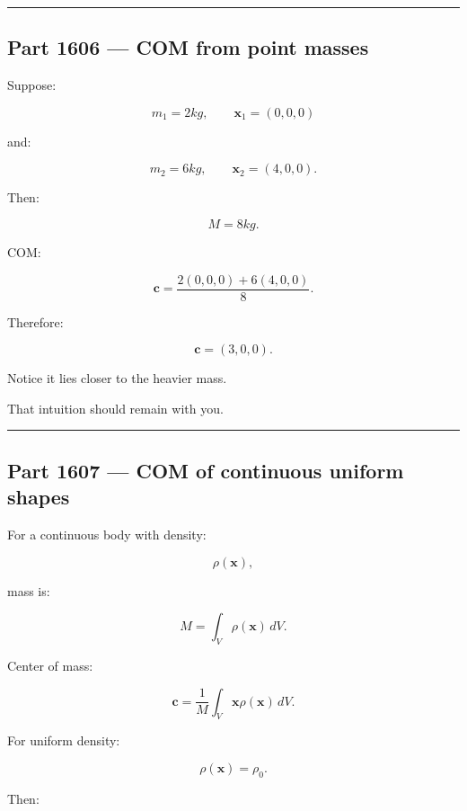 \begin{center}\rule{0.5\linewidth}{0.5pt}\end{center}

\subsection{Part 1606 --- COM from point masses}\label{06-engine-ii-ch034-part-1606-com-from-point-masses}

\hypertarget{06-engine-ii-ch034-part-1606-com-from-point-masses}{}

Suppose:

\[
m_1=2kg,\qquad
\mathbf{x}_1=(0,0,0)
\]

and:

\[
m_2=6kg,\qquad
\mathbf{x}_2=(4,0,0).
\]

Then:

\[
M=8kg.
\]

COM:

\[
\mathbf{c}
=
\frac{
2(0,0,0)+6(4,0,0)
}{8}.
\]

Therefore:

\[
\boxed{
\mathbf{c}=(3,0,0).
}
\]

Notice it lies closer to the heavier mass.

That intuition should remain with you.

\begin{center}\rule{0.5\linewidth}{0.5pt}\end{center}

\subsection{Part 1607 --- COM of continuous uniform shapes}\label{06-engine-ii-ch034-part-1607-com-of-continuous-uniform-shapes}

\hypertarget{06-engine-ii-ch034-part-1607-com-of-continuous-uniform-shapes}{}

For a continuous body with density:

\[
\rho(\mathbf{x}),
\]

mass is:

\[
M
=
\int_V
\rho(\mathbf{x})\,dV.
\]

Center of mass:

\[
\boxed{
\mathbf{c}
=
\frac{1}{M}
\int_V
\mathbf{x}\rho(\mathbf{x})\,dV.
}
\]

For uniform density:

\[
\rho(\mathbf{x})=\rho_0.
\]

Then:

